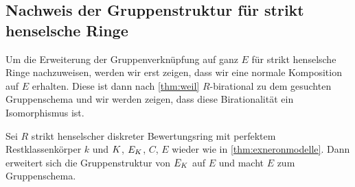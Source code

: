 \documentclass[german, bibliography=totoc]{scrreprt}
\begin{document}
\subsection{Nachweis der Gruppenstruktur für strikt henselsche Ringe}
Um die Erweiterung der Gruppenverknüpfung auf ganz $E$ für strikt
henselsche Ringe nachzuweisen, werden wir erst zeigen, dass wir eine
normale Komposition auf $E$ erhalten.
Diese ist dann nach \ref{thm:weil} $R$-birational zu dem gesuchten
Gruppenschema und wir werden zeigen, dass diese Birationalität ein
Isomorphismus ist.
\begin{Satz}\label{thm:egruppenschema}
  Sei $R$ strikt henselscher diskreter Bewertungsring mit perfektem
  Restklassenkörper $k$ und $K$, $E_{K}$, $C$, $E$ wieder wie in
  \ref{thm:exneronmodelle}.
  Dann erweitert sich die Gruppenstruktur von $E_{K}$ auf $E$ und macht
  $E$ zum Gruppenschema.
\end{Satz}
\end{document}
